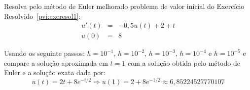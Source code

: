 \begin{exeresol}\label{pvi:exeresol1_euler_melhorado} Resolva pelo método de Euler melhorado problema de valor inicial do Exercício Resolvido~\ref{pvi:exeresol1}:
\begin{eqnarray}
     u'(t)&=& -0,5u(t)+2+t\\
            u(0) &=&  8
\end{eqnarray}

Usando os seguinte passos: $h=10^{-1}$, $h=10^{-2}$, $h=10^{-3}$, $h=10^{-4}$ e $h=10^{-5}$ e compare a solução aproximada em $t=1$ com a solução obtida pelo método de Euler e a solução exata dada por:
\begin{equation}
     u(t) = 2t+8e^{-t/2} \Longrightarrow u(1)=2+8e^{-1/2} \approx 6,85224527770107
\end{equation}
\end{exeresol}

